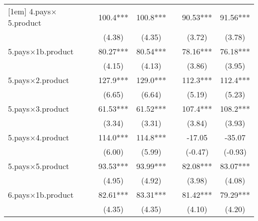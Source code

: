 {\begin{tabular}{l*{6}{c}}
[1em]
4.pays$\times$5.product    &                     &       100.4***&       100.8***&                     &       90.53***&       91.56***\\
                    &                     &      (4.38)         &      (4.35)         &                     &      (3.72)         &      (3.78)         \\
[1em]
5.pays$\times$1b.product   &                     &       80.27***&       80.54***&                     &       78.16***&       76.18***\\
                    &                     &      (4.15)         &      (4.13)         &                     &      (3.86)         &      (3.95)         \\
[1em]
5.pays$\times$2.product    &                     &       127.9***&       129.0***&                     &       112.3***&       112.4***\\
                    &                     &      (6.65)         &      (6.64)         &                     &      (5.19)         &      (5.23)         \\
[1em]
5.pays$\times$3.product    &                     &       61.53***&       61.52***&                     &       107.4***&       108.2***\\
                    &                     &      (3.34)         &      (3.31)         &                     &      (3.84)         &      (3.93)         \\
[1em]
5.pays$\times$4.product    &                     &       114.0***&       114.8***&                     &      -17.05         &      -35.07         \\
                    &                     &      (6.00)         &      (5.99)         &                     &     (-0.47)         &     (-0.93)         \\
[1em]
5.pays$\times$5.product    &                     &       93.53***&       93.99***&                     &       82.08***&       83.07***\\
                    &                     &      (4.95)         &      (4.92)         &                     &      (3.98)         &      (4.08)         \\
[1em]
6.pays$\times$1b.product   &                     &       82.61***&       83.31***&                     &       81.42***&       79.29***\\
                    &                     &      (4.35)         &      (4.35)         &                     &      (4.10)         &      (4.20)         \\

\end{tabular}}
